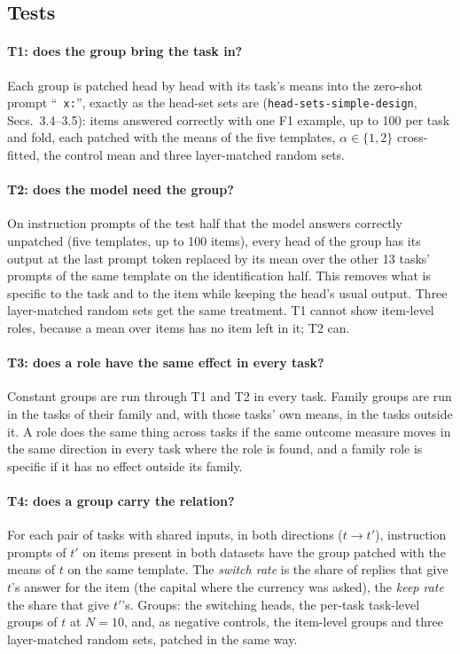 \documentclass[10pt,a4paper]{article}
\newcommand{\p}[1]{``\texttt{#1}''}
\newcommand{\simpledoc}{\texttt{head-sets-simple-design}}
\begin{document}
\subsection{Tests}\label{sec:tests}

\paragraph{T1: does the group bring the task in?} Each group is patched head by head with its task's means into the zero-shot prompt \p{ x:}, exactly as the head-set sets are (\simpledoc, Secs.~3.4--3.5): items answered correctly with one F1 example, up to 100 per task and fold, each patched with the means of the five templates, $\alpha\in\{1,2\}$ cross-fitted, the control mean and three layer-matched random sets.

\paragraph{T2: does the model need the group?} On instruction prompts of the test half that the model answers correctly unpatched (five templates, up to 100 items), every head of the group has its output at the last prompt token replaced by its mean over the other 13 tasks' prompts of the same template on the identification half. This removes what is specific to the task and to the item while keeping the head's usual output. Three layer-matched random sets get the same treatment. T1 cannot show item-level roles, because a mean over items has no item left in it; T2 can.

\paragraph{T3: does a role have the same effect in every task?} Constant groups are run through T1 and T2 in every task. Family groups are run in the tasks of their family and, with those tasks' own means, in the tasks outside it. A role does the same thing across tasks if the same outcome measure moves in the same direction in every task where the role is found, and a family role is specific if it has no effect outside its family.

\paragraph{T4: does a group carry the relation?} For each pair of tasks with shared inputs, in both directions ($t\to t'$), instruction prompts of $t'$ on items present in both datasets have the group patched with the means of $t$ on the same template. The \emph{switch rate} is the share of replies that give $t$'s answer for the item (the capital where the currency was asked), the \emph{keep rate} the share that give $t'$'s. Groups: the switching heads, the per-task task-level groups of $t$ at $N=10$, and, as negative controls, the item-level groups and three layer-matched random sets, patched in the same way.
\end{document}

